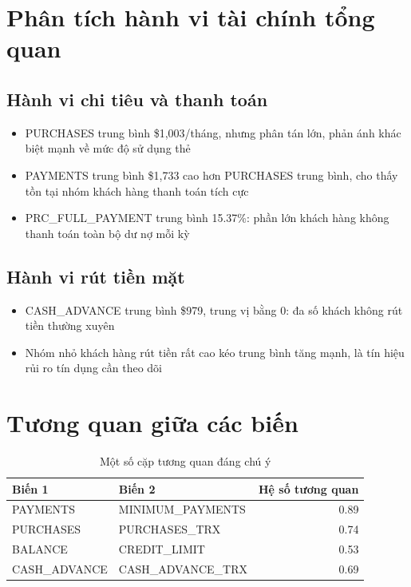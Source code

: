 \section{Phân tích hành vi tài chính tổng quan}

\subsection{Hành vi chi tiêu và thanh toán}

\begin{itemize}
    \item PURCHASES trung bình \$1,003/tháng, nhưng phân tán lớn, phản ánh khác biệt mạnh về mức độ sử dụng thẻ
    \item PAYMENTS trung bình \$1,733 cao hơn PURCHASES trung bình, cho thấy tồn tại nhóm khách hàng thanh toán tích cực
    \item PRC\_FULL\_PAYMENT trung bình 15.37\%: phần lớn khách hàng không thanh toán toàn bộ dư nợ mỗi kỳ
\end{itemize}

\subsection{Hành vi rút tiền mặt}

\begin{itemize}
    \item CASH\_ADVANCE trung bình \$979, trung vị bằng 0: đa số khách không rút tiền thường xuyên
    \item Nhóm nhỏ khách hàng rút tiền rất cao kéo trung bình tăng mạnh, là tín hiệu rủi ro tín dụng cần theo dõi
\end{itemize}

\section{Tương quan giữa các biến}

\begin{table}[H]
\centering
\caption{Một số cặp tương quan đáng chú ý}
\begin{tabular}{|l|l|r|}
\hline
\textbf{Biến 1} & \textbf{Biến 2} & \textbf{Hệ số tương quan} \\
\hline
PAYMENTS & MINIMUM\_PAYMENTS & 0.89 \\
\hline
PURCHASES & PURCHASES\_TRX & 0.74 \\
\hline
BALANCE & CREDIT\_LIMIT & 0.53 \\
\hline
CASH\_ADVANCE & CASH\_ADVANCE\_TRX & 0.69 \\
\hline
\end{tabular}
\end{table}

